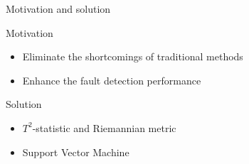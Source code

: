 \documentclass[10pt]{beamer}
\begin{document}
\begin{frame}{Motivation and solution}
\begin{exampleblock}{Motivation}
      \begin{itemize}
      \item Eliminate the shortcomings of traditional methods
      \item Enhance the fault detection performance
 	 \end{itemize}  
 	 \end{exampleblock}
 \begin{exampleblock}{Solution}
      \begin{itemize}
      \item $T^2$-statistic and Riemannian metric
      \item Support Vector Machine
 	 \end{itemize}  
 	 \end{exampleblock}

\end{frame}
\end{document}
